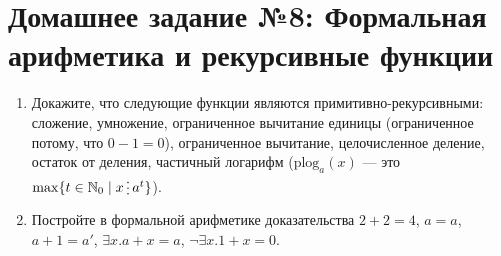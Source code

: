 \documentclass[10pt,a4paper,oneside]{article}
\begin{document}
\section*{Домашнее задание №8: Формальная арифметика и рекурсивные функции}

\begin{enumerate}
\item Докажите, что следующие функции являются примитивно-рекурсивными: сложение, умножение,
ограниченное вычитание единицы (ограниченное потому, что $0-1=0$), ограниченное вычитание,
целочисленное деление, остаток от деления, частичный логарифм 
($\mathrm{plog}_a(x)$ --- это $\max \{t \in \mathbb{N}_0 \mid x \mathop{\raisebox{-2pt}{\vdots}} a^t \}$).

\item Постройте в формальной арифметике доказательства $2+2=4$, $a=a$, 
$a+1=a'$, $\exists x.a+x=a$, $\neg\exists x.1+x=0$.
\end{enumerate}
\end{document}
